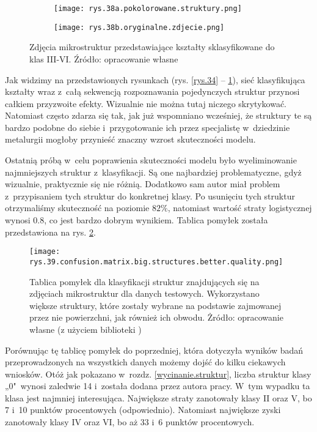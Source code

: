 \begin{figure}[!h]
	\centering
	\begin{subfigure}{0.41\textwidth}
	    \centering
	    \texttt{[image: rys.38a.pokolorowane.struktury.png]}
	\end{subfigure}
	\begin{subfigure}{0.41\textwidth}
	    \centering
	    \texttt{[image: rys.38b.oryginalne.zdjecie.png]}
	\end{subfigure}
	\caption{\label{rys.38}Zdjęcia mikrostruktur przedstawiające kształty sklasyfikowane do klas III-VI. Źródło: opracowanie własne}
\end{figure}
Jak widzimy na przedstawionych rysunkach (rys. \ref{rys.34} – \ref{rys.38}), sieć klasyfikująca kształty wraz z~całą sekwencją rozpoznawania pojedynczych struktur przynosi całkiem przyzwoite efekty. Wizualnie nie można tutaj niczego skrytykować. Natomiast często zdarza się tak, jak już wspomniano wcześniej, że struktury te są bardzo podobne do siebie i~przygotowanie ich przez specjalistę w~dziedzinie metalurgii mogłoby przynieść znaczny wzrost skuteczności modelu.

Ostatnią próbą w~celu poprawienia skuteczności modelu było wyeliminowanie najmniejszych struktur z~klasyfikacji. Są one najbardziej problematyczne, gdyż wizualnie, praktycznie się nie różnią. Dodatkowo sam autor miał problem z~przypisaniem tych struktur do konkretnej klasy. Po usunięciu tych struktur otrzymaliśmy skuteczność na poziomie $82\%$, natomiast wartość straty logistycznej wynosi $0.8$, co jest bardzo dobrym wynikiem. Tablica pomyłek została przedstawiona na rys. \ref{rys.39.confusion.matrix.big.structures.png}. 
\begin{figure}[h]
    \centering
    \texttt{[image: rys.39.confusion.matrix.big.structures.better.quality.png]}  %
    \caption{Tablica pomyłek dla klasyfikacji struktur znajdujących się na zdjęciach mikrostruktur dla danych testowych. Wykorzystano większe struktury, które zostały wybrane na podstawie zajmowanej przez nie powierzchni, jak również ich obwodu. Żródło: opracowanie własne (z użyciem biblioteki )}
    \label{rys.39.confusion.matrix.big.structures.png}
\end{figure}
Porównując tę tablicę pomyłek do poprzedniej, która dotyczyła wyników badań przeprowadzonych na wszystkich danych możemy dojść do kilku ciekawych wniosków. Otóż jak pokazano w~rozdz. \ref{wycinanie.struktur}, liczba struktur klasy „0"~wynosi zaledwie 14 i~została dodana przez autora pracy. W~tym wypadku ta klasa jest najmniej interesująca. 
Największe straty zanotowały klasy II oraz V, bo 7 i~10 punktów procentowych (odpowiednio). Natomiast największe zyski zanotowały klasy IV oraz VI, bo aż 33 i~6 punktów procentowych.

